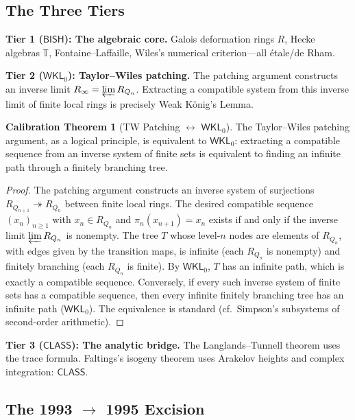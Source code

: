 \documentclass[11pt,a4paper]{article}
\theoremstyle{plain}
\theoremstyle{definition}
\newtheorem{calibration}[theorem]{Calibration Theorem}
\newcommand{\BISH}{\textsf{BISH}}
\newcommand{\WKL}{\textsf{WKL}_0}
\newcommand{\CLASS}{\textsf{CLASS}}
\begin{document}
\subsection{The Three Tiers}

\textbf{Tier 1 ($\BISH$): The algebraic core.} Galois deformation rings $R$, Hecke algebras $\mathbb{T}$, Fontaine--Laffaille, Wiles's numerical criterion---all \'etale/de Rham.

\textbf{Tier 2 ($\WKL$): Taylor--Wiles patching.} The patching argument constructs an inverse limit $R_\infty = \varprojlim R_{Q_n}$. Extracting a compatible system from this inverse limit of finite local rings is precisely Weak K\"onig's Lemma.

\begin{calibration}[TW Patching $\leftrightarrow$ $\WKL$]\label{cal:tw}
The Taylor--Wiles patching argument, as a logical principle, is equivalent to $\WKL$: extracting a compatible sequence from an inverse system of finite sets is equivalent to finding an infinite path through a finitely branching tree.
\end{calibration}

\begin{proof}
The patching argument constructs an inverse system of surjections $R_{Q_{n+1}} \twoheadrightarrow R_{Q_n}$ between finite local rings. The desired compatible sequence $(x_n)_{n \geq 1}$ with $x_n \in R_{Q_n}$ and $\pi_n(x_{n+1}) = x_n$ exists if and only if the inverse limit $\varprojlim R_{Q_n}$ is nonempty. The tree $T$ whose level-$n$ nodes are elements of $R_{Q_n}$, with edges given by the transition maps, is infinite (each $R_{Q_n}$ is nonempty) and finitely branching (each $R_{Q_n}$ is finite). By $\WKL$, $T$ has an infinite path, which is exactly a compatible sequence. Conversely, if every such inverse system of finite sets has a compatible sequence, then every infinite finitely branching tree has an infinite path ($\WKL$). The equivalence is standard (cf.\ Simpson's subsystems of second-order arithmetic).
\end{proof}

\textbf{Tier 3 ($\CLASS$): The analytic bridge.} The Langlands--Tunnell theorem uses the trace formula. Faltings's isogeny theorem uses Arakelov heights and complex integration: $\CLASS$.

\subsection{The 1993 $\to$ 1995 Excision}
\end{document}
